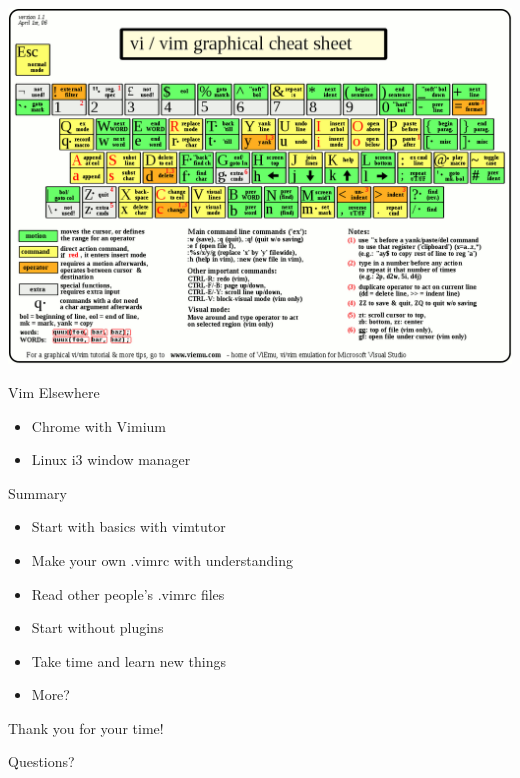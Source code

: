 \documentclass{beamer}
\begin{document}
\begin{frame}
    \begin{center}
        \includegraphics[width=1\textwidth]{images/cheat-sheet.png}
    \end{center}
\end{frame}

\begin{frame}{Vim Elsewhere}
	\begin{itemize}
		\item Chrome with Vimium
		\item Linux i3 window manager
	\end{itemize}
\end{frame}

\begin{frame}{Summary}
	\begin{itemize}
		\item Start with basics with vimtutor
		\item Make your own .vimrc with understanding
		\item Read other people's .vimrc files
		\item Start without plugins
		\item Take time and learn new things
		\item More?
	\end{itemize}
\end{frame}

\begin{frame}
    \begin{center}
        \huge Thank you for your time!
    \end{center}
    \begin{center}
        Questions?
    \end{center}
\end{frame}
\end{document}
